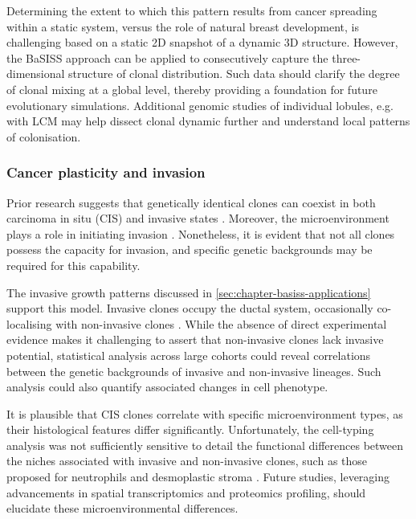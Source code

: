 Determining the extent to which this pattern results from cancer spreading within a static system, versus the role of natural breast development, is challenging based on a static 2D snapshot of a dynamic 3D structure. However, the \ac{BaSISS} approach can be applied to consecutively capture the three-dimensional structure of clonal distribution. Such data should clarify the degree of clonal mixing at a global level, thereby providing a foundation for future evolutionary simulations. Additional genomic studies of individual lobules, e.g. with \ac{LCM} may help dissect clonal dynamic further and understand local patterns of colonisation. 

\subsubsection*{Cancer plasticity and invasion}

Prior research suggests that genetically identical clones can coexist in both carcinoma in situ (\ac{CIS}) and invasive states \parencite{Casasent2018-gx}. Moreover, the microenvironment plays a role in initiating invasion \parencite{Sinha2021-mf,Risom2022-uw} . Nonetheless, it is evident that not all clones possess the capacity for invasion, and specific genetic backgrounds may be required for this capability.

The invasive growth patterns discussed in \cref{sec:chapter-basiss-applications} support this model. Invasive clones occupy the ductal system, occasionally co-localising with non-invasive clones . While the absence of direct experimental evidence makes it challenging to assert that non-invasive clones lack invasive potential, statistical analysis across large cohorts could reveal correlations between the genetic backgrounds of invasive and non-invasive lineages. Such analysis could also quantify associated changes in cell phenotype.

It is plausible that \ac{CIS} clones correlate with specific microenvironment types, as their histological features differ significantly. Unfortunately, the cell-typing analysis was not sufficiently sensitive to detail the functional differences between the niches associated with invasive and non-invasive clones, such as those proposed for neutrophils \parencite{Sinha2021-mf} and desmoplastic stroma \parencite{Risom2022-uw}. Future studies, leveraging advancements in spatial transcriptomics and proteomics profiling, should elucidate these microenvironmental differences.

